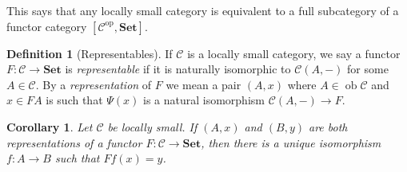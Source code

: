 \documentclass{report}
\newcommand{\mbold}[1]{\mathrm{\mathbf{#1}}}
\DeclareMathOperator{\ob}{ob}
\theoremstyle{definition}
\theoremstyle{plain}
\newtheorem{coro}[thm]{Corollary}
\theoremstyle{definition}
\newtheorem{defn}[thm]{Definition}
\begin{document}
		This says that any locally small category is equivalent to a full subcategory of a functor category $[\mathcal{C}^{\text{op}},\mbold{Set}]$.
		\begin{defn}[Representables]
			If $\mathcal{C}$ is a locally small category, we say a functor $F\colon \mathcal{C}\to\mbold{Set}$ is \emph{representable} if it is naturally isomorphic to $\mathcal{C}(A,-)$ for some $A\in\mathcal{C}$. By a \emph{representation} of $F$ we mean a pair $(A,x)$ where $A\in\ob\mathcal{C}$ and $x\in FA$ is such that $\Psi(x)$ is a natural isomorphism $\mathcal{C}(A,-)\to F$.
		\end{defn}
		\begin{coro}
			Let $\mathcal{C}$ be locally small. If $(A,x)$ and $(B,y)$ are both representations of a functor $F\colon\mathcal{C}\to \mbold{Set}$, then there is a unique isomorphism $f\colon A \to B$ such that $Ff(x) = y$.
		\end{coro}
\end{document}
